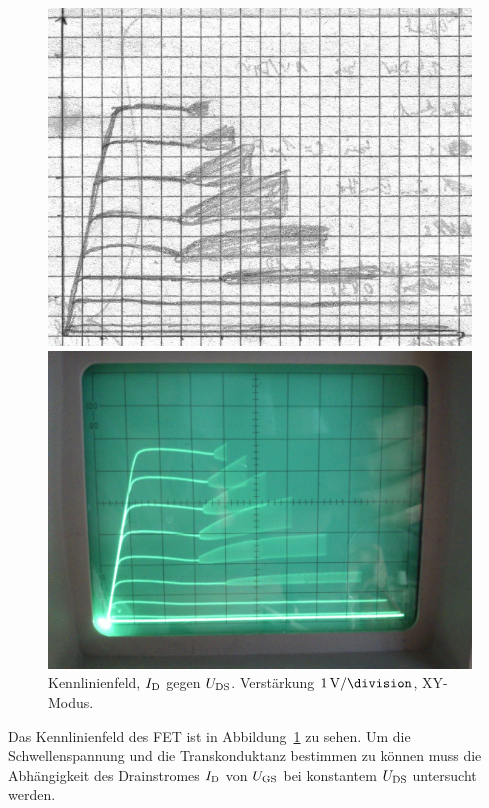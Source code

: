 \begin{figure}
	\centering
	\label{fig:4}
	\begin{minipage}{0.45\linewidth}
		\includegraphics[width=\linewidth]{Oszi_Hand/3-04.jpg}
	\end{minipage}
	\hfill
	\begin{minipage}{.45\linewidth}
		\includegraphics[width=\linewidth]{Oszi_Foto/3-04.jpg}
	\end{minipage}
	\caption{%
		Kennlinienfeld, $I_\text{D}$ gegen $U_\text{DS}$. Verstärkung $\SI
		1{\volt\per\division}$, XY-Modus.
	}
\end{figure}

Das Kennlinienfeld des FET ist in Abbildung~\ref{fig:4} zu sehen. Um die
Schwellenspannung und die Transkonduktanz bestimmen zu können muss die
Abhängigkeit des Drainstromes $I_\text{D}$ von $U_\text{GS}$ bei konstantem $U_\text{DS}$ untersucht
werden.


